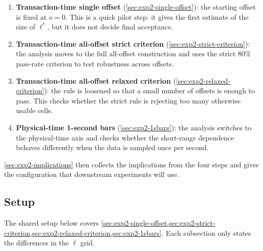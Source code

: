 \documentclass[11pt,titlepage,openany,oneside]{book}  %
\begin{document}
\begin{enumerate}
\item \textbf{Transaction-time single offset} (\cref{sec:exp2-single-offset}): the starting offset is fixed at $o = 0$. This is a quick pilot step: it gives the first estimate of the size of $\ell^*$, but it does not decide final acceptance.
\item \textbf{Transaction-time all-offset strict criterion} (\cref{sec:exp2-strict-criterion}): the analysis moves to the full all-offset construction and uses the strict $80\%$ pass-rate criterion to test robustness across offsets.
\item \textbf{Transaction-time all-offset relaxed criterion} (\cref{sec:exp2-relaxed-criterion}): the rule is loosened so that a small number of offsets is enough to pass. This checks whether the strict rule is rejecting too many otherwise usable cells.
\item \textbf{Physical-time 1-second bars} (\cref{sec:exp2-1sbars}): the analysis switches to the physical-time axis and checks whether the short-range dependence behaves differently when the data is sampled once per second.
\end{enumerate}

\cref{sec:exp2-implications} then collects the implications from the four steps and gives the configuration that downstream experiments will use.

\subsection{Setup}
\label{sec:exp2-setup}

The shared setup below covers \cref{sec:exp2-single-offset,sec:exp2-strict-criterion,sec:exp2-relaxed-criterion,sec:exp2-1sbars}. Each subsection only states the differences in the $\ell$ grid.
\end{document}
